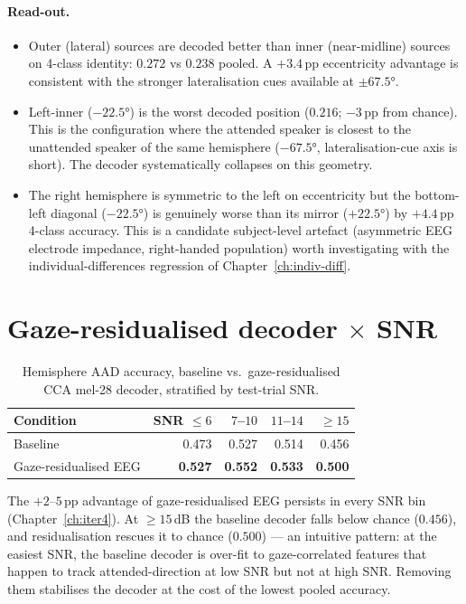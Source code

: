 \paragraph{Read-out.}
\begin{itemize}
  \item Outer (lateral) sources are decoded better than inner (near-midline)
        sources on 4-class identity: $0.272$ vs $0.238$ pooled. A
        $+3.4$\,pp eccentricity advantage is consistent with the
        stronger lateralisation cues available at $\pm 67.5°$.
  \item Left-inner ($-22.5°$) is the worst decoded position
        ($0.216$; $-3$\,pp from chance). This is the configuration
        where the attended speaker is closest to the unattended
        speaker of the same hemisphere ($-67.5°$, lateralisation-cue
        axis is short). The decoder systematically collapses on this
        geometry.
  \item The right hemisphere is symmetric to the left on eccentricity
        but the bottom-left diagonal ($-22.5°$) is genuinely worse
        than its mirror ($+22.5°$) by $+4.4$\,pp 4-class accuracy. This
        is a candidate subject-level artefact (asymmetric EEG electrode
        impedance, right-handed population) worth investigating with
        the individual-differences regression of
        Chapter~\ref{ch:indiv-diff}.
\end{itemize}

\section{Gaze-residualised decoder $\times$ SNR}

\begin{table}[ht]
\centering
\begin{tabular}{lrrrr}
\toprule
Condition & SNR $\leq 6$ & $7$--$10$ & $11$--$14$ & $\geq 15$ \\
\midrule
Baseline              & 0.473 & 0.527 & 0.514 & 0.456 \\
Gaze-residualised EEG & \textbf{0.527} & \textbf{0.552} & \textbf{0.533} & \textbf{0.500} \\
\bottomrule
\end{tabular}
\caption{Hemisphere AAD accuracy, baseline vs.\ gaze-residualised CCA
mel-28 decoder, stratified by test-trial SNR.}
\end{table}

The $+2$--$5$\,pp advantage of gaze-residualised EEG persists in every
SNR bin (Chapter~\ref{ch:iter4}). At $\geq 15$\,dB the baseline decoder
falls below chance ($0.456$), and residualisation rescues it to chance
($0.500$) --- an intuitive pattern: at the easiest SNR, the baseline
decoder is over-fit to gaze-correlated features that happen to track
attended-direction at low SNR but not at high SNR. Removing them
stabilises the decoder at the cost of the lowest pooled accuracy.

